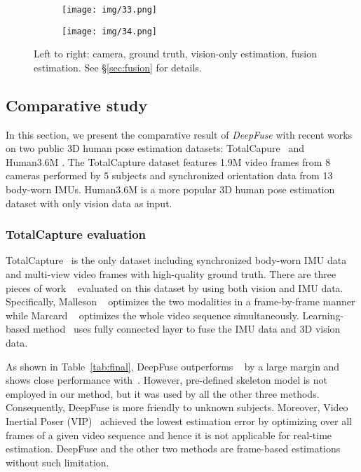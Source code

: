 \documentclass[10pt,twocolumn,letterpaper]{article}
\begin{document}
\begin{figure}
\begin{subfigure}[b]{0.11\textwidth}
    \end{subfigure}
    \begin{subfigure}[b]{0.11\textwidth}
    \centering
        \texttt{[image: img/33.png]}
    \end{subfigure}
    \begin{subfigure}[b]{0.11\textwidth}
    \centering
        \texttt{[image: img/34.png]}
    \end{subfigure}
\caption{Left to right: camera, ground truth, vision-only estimation, fusion estimation. See \S\ref{sec:fusion} for details.}
\label{fig:qual}
    \vspace*{-8pt}
\end{figure}

\subsection{Comparative study}


In this section, we present the comparative result of \emph{DeepFuse} with recent works on two public 3D human pose estimation datasets: TotalCapure~\cite{trumble2017total} and Human3.6M \cite{h36m_pami}. The TotalCapture dataset features 1.9M video frames from 8 cameras performed by 5 subjects and synchronized orientation data from 13 body-worn IMUs. Human3.6M is a more popular 3D human pose estimation dataset with only vision data as input. 

\vspace{-0.3cm}
\subsubsection{TotalCapture evaluation}
\label{sec:tc_eval}
TotalCapture~\cite{trumble2017total} is the only dataset including synchronized body-worn IMU data and multi-view video frames with high-quality ground truth. There are three pieces of work ~\cite{trumble2017total,malleson2017real,von2018recovering} evaluated on this dataset by using both vision and IMU data. Specifically, Malleson \etal~\cite{malleson2017real} optimizes the two modalities in a frame-by-frame manner while Marcard \etal~\cite{von2018recovering} optimizes the whole video sequence simultaneously. Learning-based method~\cite{trumble2017total} uses fully connected layer to fuse the IMU data and 3D vision data. 

As shown in Table~\ref{tab:final}, DeepFuse outperforms ~\cite{trumble2017total,malleson2017real} by a large margin and shows close performance with~\cite{von2018recovering}. However, pre-defined skeleton model is not employed in our method, but it was used by all the other three methods. Consequently, DeepFuse is more friendly to unknown subjects. Moreover, Video Inertial Poser (VIP)~\cite{von2018recovering} achieved the lowest estimation error by optimizing over all frames of a given video sequence and hence it is not applicable for real-time estimation. DeepFuse and the other two methods are frame-based estimations without such limitation. 
\end{document}
